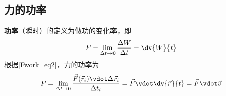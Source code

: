 \subsection{力的功率}
\textbf{功率}（瞬时）的定义为做功的变化率，即
\begin{equation}
P = \lim_{\Delta t\to 0} \frac{\Delta W}{\Delta t} = \dv{W}{t}
\end{equation}
根据\autoref{Fwork_eq2}，力的功率为
\begin{equation}
P = \lim_{\Delta t\to 0} \frac{\vec F(\vec r_i)\vdot\Delta\vec r_i}{\Delta t_i} = \vec F \vdot\dv{\vec r}{t} = \vec F\vdot\vec v
\end{equation}






